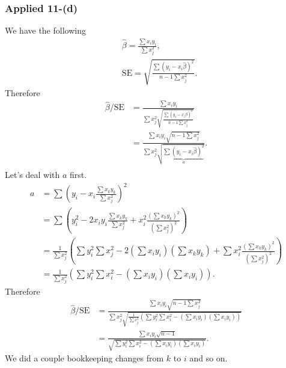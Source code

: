 \subsubsection{Applied 11-(d)}
We have the following
\begin{align}
&\hat{\beta} = \frac{\sum x_iy_i}{\sum x_j^2}, \\
&\text{SE} = \sqrt{\frac{\sum(y_i - x_i\hat{\beta})^2}{n-1\sum x_j^2}}.
\end{align}
Therefore  
\begin{align}
\hat{\beta}/\text{SE} & = \frac{\sum x_iy_i}{\sum x_j^2 \sqrt{\frac{\sum(y_i - x_i\hat{\beta})^2}{n-1\sum x_j^2}}} \\
& = \frac{\sum x_iy_i\sqrt{n-1\sum x_j^2}}{\sum x_j^2\sqrt{\underbrace{\sum(y_i - x_i\hat{\beta})^2}_a}}. \\
\end{align}
Let's deal with $a$ first.
\begin{align}
a &= \sum(y_i - x_i \frac{\sum x_ky_k}{\sum x_j^2})^2\\
&= \sum (y_i^2 - 2x_iy_i \frac{\sum x_ky_k}{\sum x_j^2} + x_i^2 \frac{(\sum x_ky_k)^2}{(\sum x_j^2)^2}) \\
& = \frac{1}{\sum x_j^2}(\sum y_i^2 \sum x_j^2 - 2(\sum x_iy_i)(\sum x_ky_k) + \sum x_i^2\frac{(\sum x_ky_k)^2}{(\sum x_j^2)^2}) \\
& = \frac{1}{\sum x_j^2}(\sum y_i^2 \sum x_i^2 - (\sum x_iy_i)(\sum x_iy_i)).
\end{align}
Therefore
\begin{align}
\hat{\beta}/\text{SE}  & = \frac{\sum x_iy_i\sqrt{n-1\sum x_j^2}}{\sum x_j^2\sqrt{\frac{1}{\sum x_j^2}(\sum y_i^2 \sum x_i^2 - (\sum x_iy_i)(\sum x_iy_i))}} \\
& =  \frac{\sum x_iy_i\sqrt{n-1}}{\sqrt{\sum y_i^2 \sum x_i^2 - (\sum x_iy_i)(\sum x_iy_i)}}.
\end{align}
We did a couple bookkeeping changes from $k$ to $i$ and so on. 